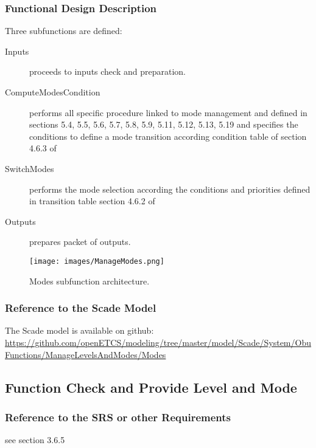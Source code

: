 \subsubsection{Functional Design Description}

Three subfunctions are defined:
\begin{description}
\item[Inputs] proceeds to inputs check and preparation.
\item[ComputeModesCondition] performs all specific procedure linked to mode management and defined in  \citep{subset-026} sections 5.4, 5.5, 5.6, 5.7, 5.8, 5.9, 5.11, 5.12, 5.13, 5.19 and specifies the conditions to define a mode transition according condition table of section 4.6.3 of \citep{subset-026}
\item[SwitchModes] performs the mode selection according the conditions and priorities defined in transition table  section 4.6.2 of \citep{subset-026}
\item[Outputs] prepares packet of outputs.
\end{description}


\begin{figure}
\centering
\texttt{[image: images/ManageModes.png]}
\caption{Modes subfunction architecture.}
\end{figure}

\subsubsection{Reference to the Scade Model}
The Scade model is available on github:
\url{https://github.com/openETCS/modeling/tree/master/model/Scade/System/ObuFunctions/ManageLevelsAndModes/Modes}



\subsection{Function Check and Provide Level and Mode}%
\subsubsection{Reference to the SRS or other Requirements}
see \citep{subset-026} section 3.6.5

